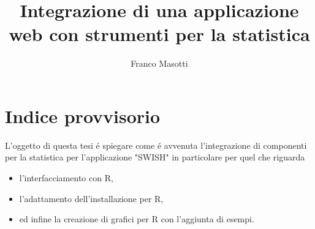 \documentclass[10pt,titlepage,twoside,a4paper]{report}
\title{Integrazione di una applicazione web con strumenti per la statistica}
\author{Franco Masotti}
\begin{document}

\maketitle
\newpage
\tableofcontents
\newpage
\listoffigures
\newpage
\listoftables
\newpage
\listoflistings
\cleardoublepage


\chapter{Indice provvisorio} \label{Indice provvisorio}
L'oggetto di questa tesi \'e spiegare come \'e avvenuta l'integrazione di 
componenti per la statistica per l'applicazione "SWISH" in particolare
per quel che riguarda
\begin{itemize}
    \item l'interfacciamento con R,
    \item l'adattamento dell'installazione per R,
    \item ed infine la creazione di grafici per R con l'aggiunta di esempi.
\end{itemize}
\end{document}
